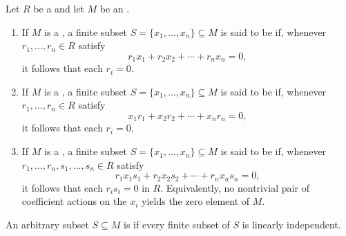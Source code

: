 \begin{definition} \label{definition:linearly_independent_elements_of_a_module_over_a_ring}
    Let $R$ be a  and let $M$ be an .
    \begin{enumerate}
        \item If $M$ is a , a finite subset $S = \{x_1, \dots, x_n\} \subseteq M$ is said to be  if, whenever $r_1, \dots, r_n \in R$ satisfy
        $$r_1 x_1 + r_2 x_2 + \cdots + r_n x_n = 0,$$
        it follows that each $r_i = 0$.

        \item If $M$ is a , a finite subset $S = \{x_1, \dots, x_n\} \subseteq M$ is said to be  if, whenever $r_1, \dots, r_n \in R$ satisfy
        $$x_1 r_1 + x_2 r_2 + \cdots + x_n r_n = 0,$$
        it follows that each $r_i = 0$.

        \item If $M$ is a , a finite subset $S = \{x_1, \dots, x_n\} \subseteq M$ is said to be  if, whenever $r_1, \dots, r_n, s_1, \dots, s_n \in R$ satisfy
        $$r_1 x_1 s_1 + r_2 x_2 s_2 + \cdots + r_n x_n s_n = 0,$$
        it follows that each $r_i s_i = 0$ in $R$. Equivalently, no nontrivial pair of coefficient actions on the $x_i$ yields the zero element of $M$.
    \end{enumerate}
    An arbitrary subset $S \subseteq M$ is  if every finite subset of $S$ is linearly independent.
\end{definition}